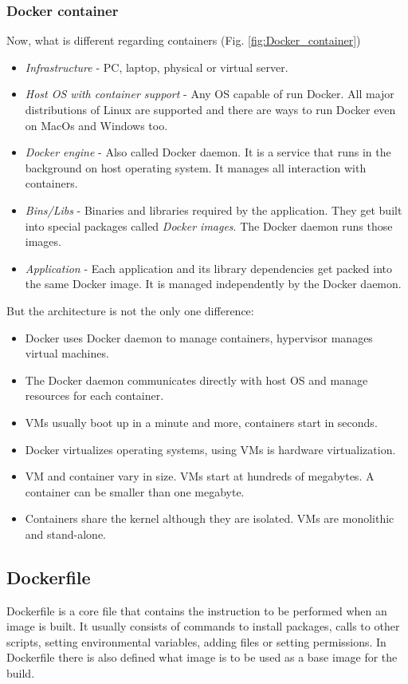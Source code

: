 \documentclass[12pt,a4paper]{article}
\begin{document}
\subsubsection{Docker container}
\noindent
Now, what is different regarding containers (Fig. \ref{fig:Docker_container})
\begin{itemize}
\item \textit{Infrastructure} - PC, laptop, physical or virtual server.
\item \textit{Host OS with container support} - Any OS capable of run Docker. All major distributions of Linux are supported and there are ways
to run Docker even on MacOs and Windows too.
\item \textit{Docker engine} - Also called Docker daemon. It is a service that runs in the background on host operating system. It manages all interaction with containers.
\item \textit{Bins/Libs} - Binaries and libraries required by the application. They get built into special packages called \textit{Docker images}.
The Docker daemon runs those images.
\item \textit{Application} - Each application and its library dependencies get packed into the same Docker image. It is managed independently by the Docker daemon. 
\end{itemize}

\noindent
But the architecture is not the only one difference:
\begin{itemize}
\item Docker uses Docker daemon to manage containers, hypervisor manages virtual machines.
\item The Docker daemon communicates directly with host OS and manage resources for each container.
\item VMs usually boot up in a minute and more, containers start in seconds.
\item Docker virtualizes operating systems, using VMs is hardware virtualization.
\item VM and container vary in size. VMs start at hundreds of megabytes. A container can be smaller than one megabyte.
\item Containers share the kernel although they are isolated. VMs are monolithic and stand-alone.
\end{itemize}

\subsection{Dockerfile}
Dockerfile is a core file that contains the instruction to be performed when an image is built. It usually consists of commands to install packages, calls to other scripts, setting environmental variables, adding files or setting permissions. In Dockerfile there is also defined what image is to be used as a base image for the build.
\end{document}
